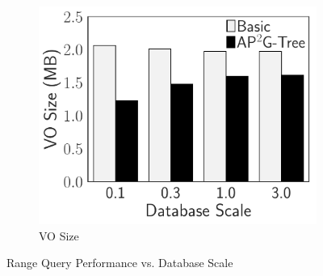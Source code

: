 \begin{figure}[t]
\begin{subfigure}{.33\linewidth}
        \includegraphics[width=\linewidth]{exp-figs/access-control/scale_vo.pdf}
        \caption{VO Size}\label{exp-fig:scale_vo}
    \end{subfigure}
    \caption{Range Query Performance vs. Database Scale}\label{exp-fig:access-control:scale}
\end{figure}
